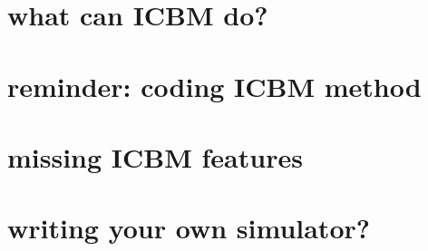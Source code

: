 

\section{what can ICBM do?}




\section{reminder: coding ICBM method}






\section{missing ICBM features}



\section{writing your own simulator?}



